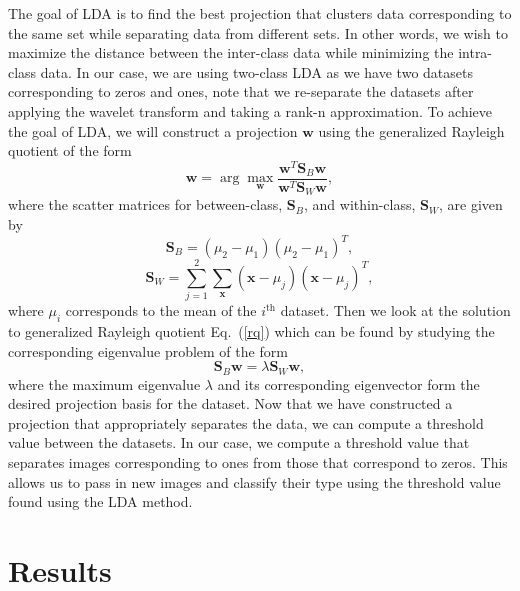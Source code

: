 \documentclass[12pt]{article}%
\newcommand\fullref[1]{Eq.~(\ref*{#1})} %
\numberwithin{equation}{subsection}
\begin{document}
The goal of LDA is to find the best projection that clusters data corresponding to the same set while separating data from different sets. In other words, we wish to maximize the distance between the inter-class data while minimizing the intra-class data. In our case, we are using two-class LDA as we have two datasets corresponding to zeros and ones, note that we re-separate the datasets after applying the wavelet transform and taking a rank-n approximation. To achieve the goal of LDA, we will construct a projection $\mathbf{w}$ using the generalized Rayleigh quotient of the form
\begin{equation} \label{rq}
    \mathbf{w} = \arg \max_{\mathbf{w}} \frac{\mathbf{w}^T \mathbf{S}_B \mathbf{w}}{\mathbf{w}^T \mathbf{S}_W \mathbf{w}},
\end{equation}   
where the scatter matrices for between-class, $\mathbf{S}_B$, and within-class, $\mathbf{S}_W$, are given by
\begin{equation}
    \mathbf{S}_B = (\mu_2 - \mu_1)(\mu_2 - \mu_1)^T,
\end{equation}
\begin{equation}
    \mathbf{S}_W = \sum_{j = 1}^{2} \sum_{\mathbf{x}} (\mathbf{x} - \mu_j)(\mathbf{x} - \mu_j)^T,
\end{equation}
where $\mu_i$ corresponds to the mean of the $i^{\text{th}}$ dataset. Then we look at the solution to generalized Rayleigh quotient \fullref{rq} which can be found by studying the corresponding eigenvalue problem of the form
\begin{equation}
    \mathbf{S}_B \mathbf{w} = \lambda \mathbf{S}_W \mathbf{w},
\end{equation}
where the maximum eigenvalue $\lambda$ and its corresponding eigenvector form the desired projection basis for the dataset. Now that we have constructed a projection that appropriately separates the data, we can compute a threshold value between the datasets. In our case, we compute a threshold value that separates images corresponding to ones from those that correspond to zeros. This allows us to pass in new images and classify their type using the threshold value found using the LDA method.  


\section{Results}
\end{document}
